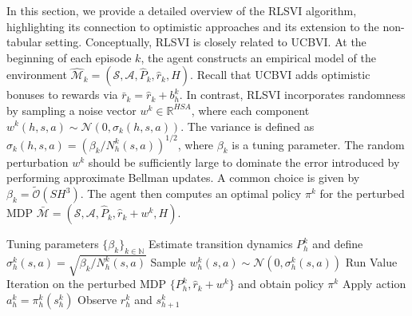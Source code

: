 \documentclass{article}
\numberwithin{equation}{section}
\newcommand{\cA}{\mathcal{A}}
\newcommand{\cS}{\mathcal{S}}
\begin{document}
In this section, we provide a detailed overview of the RLSVI algorithm, highlighting its connection to optimistic approaches and its extension to the non-tabular setting. Conceptually, RLSVI is closely related to UCBVI. At the beginning of each episode \(k\), the agent constructs an empirical model of the environment \(\widehat{\mathcal{M}}_k = ({\cS, \cA}, \widehat{P}_k, \widehat{r}_k, H)\). Recall that UCBVI adds optimistic bonuses to rewards via \(\bar{r}_k = \widehat{r}_k + b_h^k\). In contrast, RLSVI incorporates randomness by sampling a noise vector \(w^k \in \mathbb{R}^{HSA}\), where each component \(w^k(h, s, a) \sim \mathcal{N}(0, \sigma_k(h,s,a))\). The variance is defined as \(\sigma_k(h,s,a) = (\beta_k / N_h^k(s,a))^{1/2}\), where \(\beta_k\) is a tuning parameter. The random perturbation \(w^k\) should be sufficiently large to dominate the error introduced by performing approximate Bellman updates. A common choice is given by \(\beta_k = \widetilde{\mathcal{O}}(SH^3)\). The agent then computes an optimal policy \(\pi^k\) for the perturbed MDP \(\bar{\mathcal{M}} = ({\cS, \cA}, \widehat{P}_k, \widehat{r}_k + w^k, H)\).

\begin{algorithm}
	\caption{Randomized Least Squares Value Iteration (RLSVI)}
	\begin{algorithmic}[1]
		\REQUIRE Tuning parameters \(\{\beta_k\}_{k\in\mathbb{N}}\)
		    \STATE Estimate transition dynamics \(P_h^k\) and define \(\sigma_h^k(s,a) = \sqrt{\beta_k / N_h^k(s,a)}\)
            \STATE Sample \(w_h^k(s,a) \sim \mathcal{N}(0, \sigma_h^k(s,a))\)
            \STATE Run Value Iteration on the perturbed MDP \(\{P_h^k, \widehat{r}_k + w^k\}\) and obtain policy \(\pi^k\)
                \STATE Apply action \(a_h^k = \pi_h^k(s_h^k)\)
                \STATE Observe \(r_h^k\) and \(s_{h+1}^k\)
            \ENDFOR
        \ENDFOR
	\end{algorithmic}	
\end{algorithm}
\end{document}

